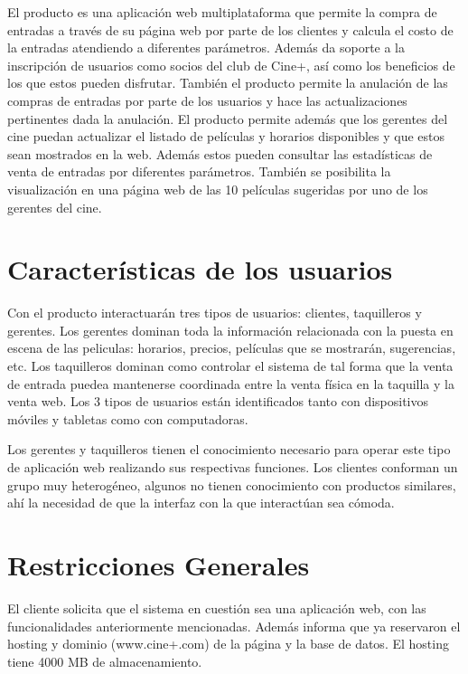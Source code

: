 \documentclass[letterpaper,12pt, oneside, onecolumn, openany]{book}
\begin{document}
El producto es una aplicación web multiplataforma que permite la compra de entradas a través de su página web por parte de los clientes y calcula el costo de la entradas atendiendo a diferentes parámetros. Además da soporte a la inscripción de usuarios como socios del club de Cine+, así como los beneficios de los que estos pueden disfrutar. También el producto permite la anulación de las compras de entradas por parte de los usuarios y hace las actualizaciones pertinentes dada la anulación. El producto permite además que los gerentes del cine puedan actualizar el listado de películas y horarios disponibles y que estos sean mostrados en la web. Además estos pueden consultar las estadísticas de venta de entradas por diferentes parámetros. También se posibilita la visualización en una página web de las 10 películas sugeridas por uno de los gerentes del cine.

\section{Características de los usuarios}

Con el producto interactuarán tres tipos de usuarios: clientes, taquilleros y gerentes. Los gerentes dominan toda la información relacionada con la puesta en escena de las peliculas: horarios, precios, películas que se mostrarán, sugerencias, etc. Los taquilleros dominan como controlar el sistema de tal forma que la venta de entrada puedea mantenerse coordinada entre la venta física en la taquilla y la venta web. Los 3 tipos de usuarios están identificados tanto con dispositivos móviles y tabletas como con computadoras.

Los gerentes y taquilleros tienen el conocimiento necesario para operar este tipo de aplicación web realizando sus respectivas funciones. Los clientes conforman un grupo muy heterogéneo, algunos no tienen conocimiento con productos similares, ahí la necesidad de que la interfaz con la que interactúan sea cómoda.

\section{Restricciones Generales}

El cliente solicita que el sistema en cuestión sea una aplicación web, con las funcionalidades anteriormente mencionadas. Además informa que ya reservaron el hosting y dominio (www.cine+.com) de la página y la base de datos. El hosting tiene 4000 MB de almacenamiento.
\end{document}
